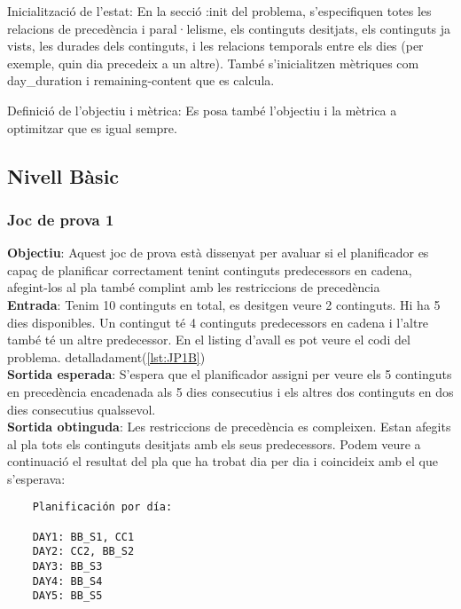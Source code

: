 \documentclass[a4paper]{article}
\begin{document}
	Inicialització de l'estat:
	En la secció :init del problema, s'especifiquen totes les relacions de precedència i paral·lelisme, els continguts desitjats, els continguts ja vists, les durades dels continguts, i les relacions temporals entre els dies (per exemple, quin dia precedeix a un altre).
	També s'inicialitzen mètriques com day\_duration i remaining-content que es calcula.
	
	Definició de l'objectiu i mètrica:
	Es posa també l'objectiu i la mètrica a optimitzar que es igual sempre.
	
	
	\subsection{Nivell Bàsic}
	
	\subsubsection{Joc de prova 1}
	\textbf{Objectiu}: Aquest joc de prova està dissenyat per avaluar si el planificador es capaç de planificar correctament tenint continguts predecessors en cadena, afegint-los al pla també complint amb les restriccions de precedència \\
	\textbf{Entrada}: Tenim 10 continguts en total, es desitgen veure 2 continguts. Hi ha 5 dies disponibles. Un contingut té 4 continguts predecessors en cadena i l'altre també té un altre predecessor. En el listing d'avall es pot veure el codi del problema.  detalladament(\ref{lst:JP1B})\\
	\textbf{Sortida esperada}: S'espera que el planificador assigni per veure els 5 continguts en precedència encadenada als 5 dies consecutius i els altres dos continguts en dos dies consecutius qualssevol. \\
	\textbf{Sortida obtinguda}:  Les restriccions de  precedència es compleixen.  Estan afegits al pla tots els continguts desitjats amb els seus predecessors. Podem veure a continuació el resultat del pla que ha trobat dia per dia i coincideix amb el que s'esperava:
	
	\begin{verbatim}
	Planificación por día:
	
	DAY1: BB_S1, CC1
	DAY2: CC2, BB_S2
	DAY3: BB_S3
	DAY4: BB_S4
	DAY5: BB_S5
		
	\end{verbatim}
	
\end{document}
